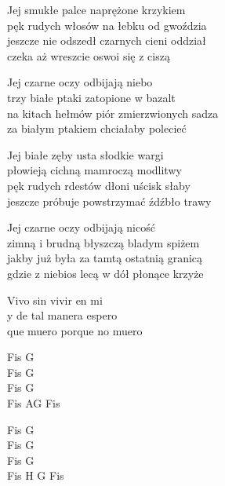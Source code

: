 \begin{text}
    Jej smukłe palce naprężone krzykiem\\
    pęk rudych włosów na łebku od gwoździa\\
    jeszcze nie odszedł czarnych cieni oddział\\
    czeka aż wreszcie oswoi się z ciszą

    Jej czarne oczy odbijają niebo\\
    trzy białe ptaki zatopione w bazalt\\
    na kitach hełmów piór zmierzwionych sadza\\
    za białym ptakiem chciałaby polecieć

    Jej białe zęby usta słodkie wargi\\
    płowieją cichną mamroczą modlitwy\\
    pęk rudych rdestów dłoni uścisk słaby\\
    jeszcze próbuje powstrzymać źdźbło trawy

    Jej czarne oczy odbijają nicość\\
    zimną i brudną błyszczą bladym spiżem\\
    jakby już była za tamtą ostatnią granicą\\
    gdzie z niebios lecą w dół płonące krzyże

    Vivo sin vivir en mi\\
    y de tal manera espero\\
    que muero porque no muero
\end{text}
\begin{chord}
    Fis G\\
    Fis G\\
    Fis G\\
    Fis AG Fis

    Fis G\\
    Fis G\\
    Fis G\\
    Fis H G Fis
\end{chord}